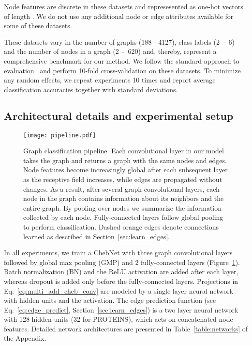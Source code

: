 \documentclass[final,nonatbib]{article} \usepackage{nips_2018}
\begin{document}
	Node features  are discrete in these datasets and represesented as one-hot vectors of length . We do not use any additional node or edge attributes available for some of these datasets.

	These datasets vary in the number of graphs (188 - 4127), class labels (2~-~6) and the number of nodes in a graph (2~-~620) and, thereby, represent a comprehensive benchmark for our method. We follow the standard approach to evaluation~\cite{shervashidze2011weisfeiler,yanardag2015deep} and perform 10-fold cross-validation on these datasets. To minimize any random effects, we repeat experiments 10 times and report average classification accuracies together with standard deviations.

	\subsection{Architectural details and experimental setup}
	\begin{figure}[]
		\begin{center}
			\texttt{[image: pipeline.pdf]}
		\end{center}
		\caption{Graph classification pipeline. Each  convolutional layer in our model takes the graph  and returns a graph with the same nodes and edges. Node features become increasingly global after each subsequent layer as the receptive field increases, while edges are propagated without changes. As a result, after several graph convolutional layers, each node in the graph contains information about its neighbors and the entire graph. By pooling over nodes we summarize the information collected by each node. Fully-connected layers follow global pooling to perform classification. Dashed orange edges denote connections learned as described in Section~\ref{sec:learn_edges}.
		}
		\label{fig:pipeline}
	\end{figure}

	In all experiments, we train a ChebNet with three graph convolutional layers followed by global max pooling (GMP) and 2 fully-connected layers (Figure~\ref{fig:pipeline}). Batch normalization (BN) and the ReLU activation are added after each layer, whereas dropout is added only before the fully-connected layers. Projections  in Eq.~\ref{eq:multi_add_cheb_conv} are modeled by a single layer neural network with  hidden units and the  activation. The edge prediction function  (see Eq.~\ref{eq:edge_predict}, Section~\ref{sec:learn_edges}) is a two layer neural network with 128 hidden units (32 for PROTEINS), which acts on concatenated node features. Detailed network architectures are presented in Table~\ref{table:networks} of the Appendix.
\end{document}
